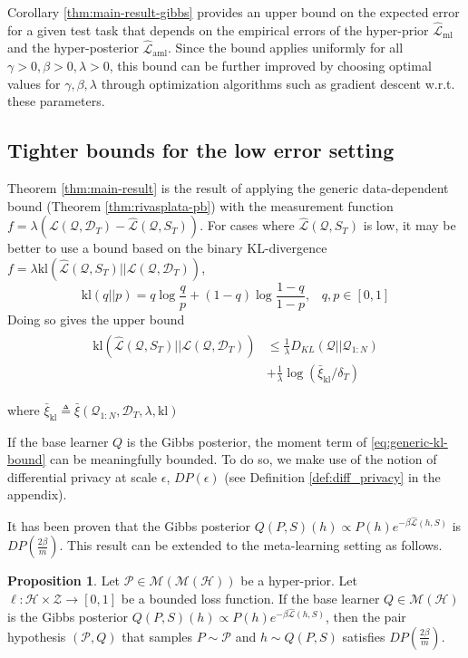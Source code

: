 \documentclass[letterpaper]{article} %
\theoremstyle{definition}
\newtheorem{proposition}[theorem]{Proposition}
\begin{document}
Corollary \ref{thm:main-result-gibbs} provides an upper bound on the expected error for a given test task that depends on the empirical errors of the hyper-prior $\hat{\mathcal{L}}_{\mathrm{ml}}$ and the hyper-posterior $\hat{\mathcal{L}}_{\mathrm{aml}}$. 
Since the bound applies uniformly for all $\gamma>0,\beta>0,\lambda>0$, this bound can be further improved by choosing optimal values for $\gamma, \beta, \lambda$ through optimization algorithms such as gradient descent w.r.t.\! these parameters.

\subsection{Tighter bounds for the low error setting}

Theorem \ref{thm:main-result} is the result of applying the generic data-dependent bound (Theorem \ref{thm:rivasplata-pb}) with the measurement function $f=\lambda(\mathcal{L}(\mathcal{Q},\mathcal{D}_T)-\hat{\mathcal{L}}(\mathcal{Q}, S_T))$. For cases where $\hat{\mathcal{L}}(\mathcal{Q}, S_T)$ is low, it may be better to use a bound based on the binary KL-divergence $f=\lambda \mathrm{kl}(\hat{\mathcal{L}}(\mathcal{Q}, S_T)||\mathcal{L}(\mathcal{Q},\mathcal{D}_T))$, 
$$
\mathrm{kl}(q||p)=q \log\frac{q}{p}+(1-q)\log\frac{1-q}{1-p},\;\;\; q,p\in[0, 1]
$$
Doing so gives the upper bound
    \begin{align} \label{eq:generic-kl-bound}
\begin{split}
\mathrm{kl}(\hat{\mathcal{L}}(\mathcal{Q}, S_T)||\mathcal{L}(\mathcal{Q},\mathcal{D}_T)) &\leq \frac{1}{\lambda} D_{KL}(\mathcal{Q}||\mathcal{Q}_{1:N})\\
&+\frac{1}{\lambda}\log\left (\bar{\xi}_{\mathrm{kl}}/\delta_T\right ) 
\end{split}
\end{align}

where $\bar{\xi}_{\mathrm{kl}}\triangleq \bar{\xi}(\mathcal{Q}_{1:N}, \mathcal{D}_T,\lambda, \mathrm{kl}) $

If the base learner $Q$ is the Gibbs posterior, the moment term of  \eqref{eq:generic-kl-bound} can be meaningfully bounded. To do so, we make use of the notion of differential privacy at scale $\epsilon$, $DP(\epsilon)$ (see Definition \ref{def:diff_privacy} in the appendix).

It has been proven \citep{McSherry2007, Rivasplata2020} that the Gibbs posterior $Q(P, S)(h)\propto P(h)e^{-\beta\hat{\mathcal{L}}(h, S)}$ is $DP\left (\frac{2\beta}{m}\right )$.
This result can be extended to the meta-learning setting as follows. 
%
\begin{proposition} \label{thm:pair-is-dp}
	Let $\mathcal{P}\in \mathcal{M}(\mathcal{M}(\mathcal{H}))$ be a hyper-prior.
	Let $\ell:\mathcal{H}\times \mathcal{Z}\rightarrow [0,1]$ be a bounded loss function. If the base learner $Q\in \mathcal{M}(\mathcal{H})$ is the Gibbs posterior $Q(P, S)(h)\propto P(h)e^{-\beta\hat{\mathcal{L}}(h, S)}$, 
	then the pair hypothesis $(\mathcal{P}, Q)$ that samples $P\sim\mathcal{P}$ and $h\sim Q(P, S)$ satisfies $DP\left (\frac{2\beta}{m}\right )$.
\end{proposition}
\end{document}
